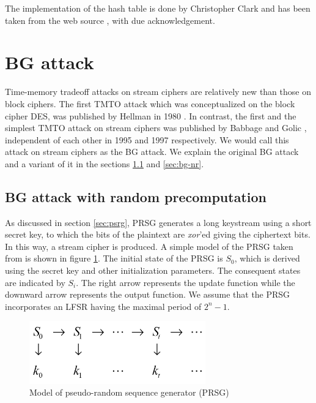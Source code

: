 The implementation of the hash table is done by Christopher Clark and has been taken from the web source \cite{hash-table-impl}, with due acknowledgement. 



\section{BG attack}
\label{sec:bg-attack}
Time-memory tradeoff attacks on stream ciphers are relatively new than those on block ciphers. The first TMTO attack which was conceptualized on the block cipher DES, was published by Hellman in 1980 \cite{hellman1980ctm}. In contrast, the first and the simplest TMTO attack on stream ciphers was published by Babbage \cite{babbage} and Golic \cite{golic}, independent of each other in 1995 and 1997 respectively. We would call this attack on stream ciphers as the BG attack. We explain the original BG attack and a variant of it in the sections \ref{sec:bg-r} and \ref{sec:bg-nr}.

\subsection{BG attack with random precomputation}
\label{sec:bg-r}

As discussed in section \ref{sec:psrg}, PRSG generates a long keystream using a short secret key, to which the bits of the plaintext are \emph{xor}'ed giving the ciphertext bits. In this way, a stream cipher is produced. A simple model of the PRSG taken from \cite{babbage} is shown in figure \ref{fig:psrg-model}. The initial state of the PRSG is $S_0$, which is derived using the secret key and other initialization parameters. The consequent states are indicated by $S_i$. The right arrow represents the update function while the downward arrow represents the output function. We assume that the PRSG incorporates an LFSR having the maximal period of $2^{n} - 1$.

\begin{figure}[h]
	\centering
	\includegraphics[width=3in]{./figures/prsgmodel.png}
	\caption{Model of pseudo-random sequence generator (PRSG)}	
	\label{fig:psrg-model}
\end{figure}

